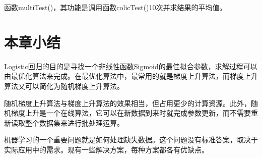函数multiTest()，其功能是调用函数colicTest()10次并求结果的平均值。

\section{本章小结}
Logistic回归的目的是寻找一个非线性函数Sigmoid的最佳拟合参数，求解过程可以由最优化算法来完成。在最优化算法中，最常用的就是梯度上升算法，而梯度上升算法又可以简化为随机梯度上升算法。

随机梯度上升算法与梯度上升算法的效果相当，但占用更少的计算资源。此外，随机梯度上升是一个在线算法，它可以在新数据到来时就完成参数更新，而不需要重新读取整个数据集来进行批处理运算。

机器学习的一个重要问题就是如何处理缺失数据。这个问题没有标准答案，取决于实际应用中的需求。现有一些解决方案，每种方案都各有优缺点。